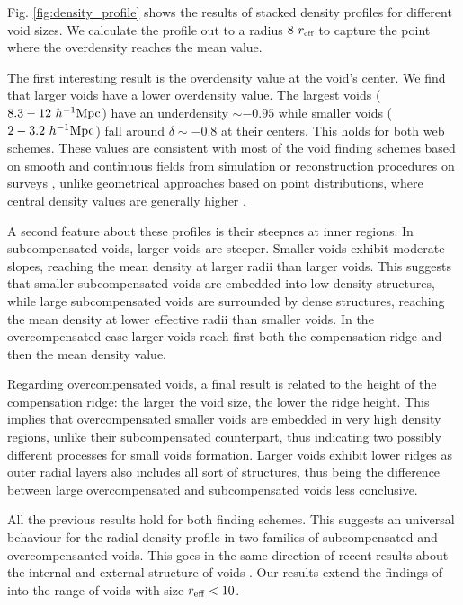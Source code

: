 \documentclass[a4,useAMS,usenatbib,usegraphicx]{mn2e}
\newcommand{\hMpc}{{\ifmmode{h^{-1}{\rm Mpc}}\else{$h^{-1}$Mpc}\fi}}
\newcommand{\reff}{{\ifmmode{r_{\mbox{\tiny eff}}}\else{$r_{\mbox{\tiny eff}}$}\fi}}
\begin{document}
Fig. \ref{fig:density_profile} shows the results of stacked density
profiles for different void sizes.  
We calculate the profile out to a radius $8\ \reff$  to capture the
point where the overdensity reaches the mean value.


The first interesting result is the overdensity value at the void's
center.
We find that larger voids have a lower overdensity value.
The largest voids ($8.3-12\ \hMpc$) have an underdensity
$\sim-0.95$ while smaller voids  ($2-3.2\ \hMpc$) fall around $\delta\sim 
-0.8$ at their centers.
This holds for both web schemes. 
These values are consistent with most of the void finding schemes
based on smooth and continuous fields from simulation or
reconstruction procedures on surveys \citep{Plionis02, Colberg05,
  Shandarin06,  Platen07, Neyrinck08, MunozCuartas11, Ceccarelli13,
  Paz13, Neyrinck13, Ricciardelli2013}, unlike geometrical approaches based 
on point distributions, where central density values are generally higher
\citep{Colberg08}. 


A second feature about these profiles is their steepnes at inner
regions.  
In subcompensated voids, larger voids are steeper.
Smaller voids exhibit moderate slopes, reaching the mean density at
larger radii than larger voids.
This suggests that smaller subcompensated voids are embedded into low
density structures, while large subcompensated voids are surrounded
by dense structures, reaching the mean density at lower effective
radii than smaller voids. 
In the overcompensated case larger voids reach first  both the
compensation ridge and then the mean density value.  


Regarding overcompensated voids, a final result is related to the height 
of the compensation ridge: the larger the void size, the lower the ridge
height. This implies that overcompensated smaller voids are embedded in 
very high density regions, unlike their subcompensated counterpart, thus 
indicating two possibly different processes for small voids formation. 
Larger voids exhibit lower ridges as outer radial layers also includes all
sort of structures, thus being the difference between large overcompensated
and subcompensated voids less conclusive.

All the previous results hold for both finding schemes.
This suggests an universal behaviour for the radial density profile in
two families of subcompensated and overcompensanted voids. 
This goes in the same direction of recent results about the internal
\citep{Colberg05,  Ricciardelli2013} and external structure of voids
\citep{Lavaux12, Ceccarelli13, Paz13, Hamaus14}. 
Our results extend the findings of \cite{Hamaus14} into the range of
voids with size $r_{\rm eff}<10$\hMpc. 
\end{document}
